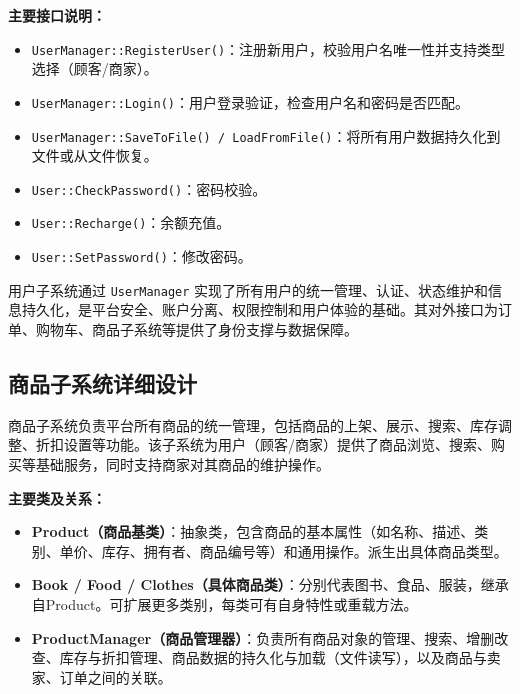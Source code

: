\documentclass[11pt]{article}
\begin{document}
\vspace{0.5em}
\textbf{主要接口说明：}
\begin{itemize}
    \item \texttt{UserManager::RegisterUser()}：注册新用户，校验用户名唯一性并支持类型选择（顾客/商家）。
    \item \texttt{UserManager::Login()}：用户登录验证，检查用户名和密码是否匹配。
    \item \texttt{UserManager::SaveToFile() / LoadFromFile()}：将所有用户数据持久化到文件或从文件恢复。
    \item \texttt{User::CheckPassword()}：密码校验。
    \item \texttt{User::Recharge()}：余额充值。
    \item \texttt{User::SetPassword()}：修改密码。
\end{itemize}

\vspace{0.5em}
用户子系统通过 \texttt{UserManager} 实现了所有用户的统一管理、认证、状态维护和信息持久化，是平台安全、账户分离、权限控制和用户体验的基础。其对外接口为订单、购物车、商品子系统等提供了身份支撑与数据保障。

\subsection{商品子系统详细设计}

商品子系统负责平台所有商品的统一管理，包括商品的上架、展示、搜索、库存调整、折扣设置等功能。该子系统为用户（顾客/商家）提供了商品浏览、搜索、购买等基础服务，同时支持商家对其商品的维护操作。

\vspace{0.5em}
\textbf{主要类及关系：}
\begin{itemize}
    \item \textbf{Product（商品基类）}：抽象类，包含商品的基本属性（如名称、描述、类别、单价、库存、拥有者、商品编号等）和通用操作。派生出具体商品类型。
    \item \textbf{Book / Food / Clothes（具体商品类）}：分别代表图书、食品、服装，继承自Product。可扩展更多类别，每类可有自身特性或重载方法。
    \item \textbf{ProductManager（商品管理器）}：负责所有商品对象的管理、搜索、增删改查、库存与折扣管理、商品数据的持久化与加载（文件读写），以及商品与卖家、订单之间的关联。
\end{itemize}
\end{document}
